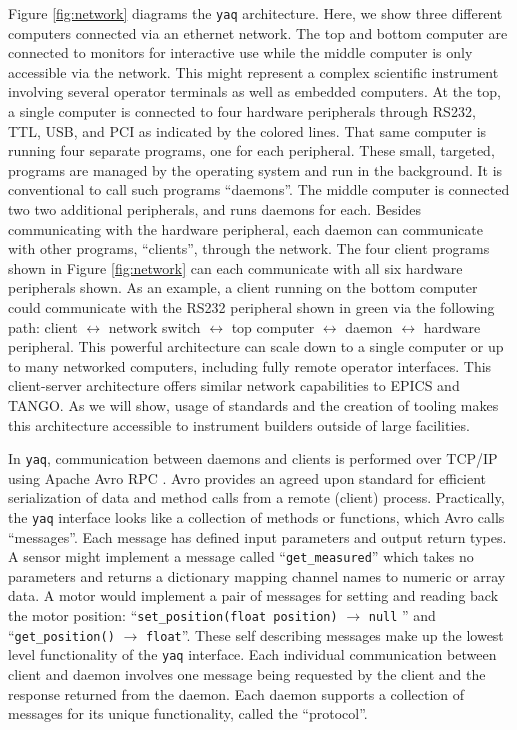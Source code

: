 \documentclass[aip, amsmath, amssymb, reprint,]{revtex4-1}
\newcommand\yaq{\texttt{yaq}}
\begin{document}
Figure \ref{fig:network} diagrams the \yaq{} architecture.
Here, we show three different computers connected via an ethernet network.
The top and bottom computer are connected to monitors for interactive use while the middle computer is only accessible via the network.
This might represent a complex scientific instrument involving several operator terminals as well as embedded computers.
At the top, a single computer is connected to four hardware peripherals through RS232, TTL, USB, and PCI as indicated by the colored lines.
That same computer is running four separate programs, one for each peripheral.
These small, targeted, programs are managed by the operating system and run in the background.
It is conventional to call such programs ``daemons''\cite{Raymond_1996}.
The middle computer is connected two two additional peripherals, and runs daemons for each.
Besides communicating with the hardware peripheral, each daemon can communicate with other programs, ``clients'',  through the network.
The four client programs shown in Figure \ref{fig:network} can each communicate with all six hardware peripherals shown.
As an example, a client running on the bottom computer could communicate with the RS232 peripheral shown in green via the following path: client $\leftrightarrow$ network switch $\leftrightarrow$ top computer $\leftrightarrow$ daemon $\leftrightarrow$ hardware peripheral.
This powerful architecture can scale down to a single computer or up to many networked computers, including fully remote operator interfaces.
This client-server architecture offers similar network capabilities to EPICS and TANGO.
As we will show, usage of standards and the creation of tooling makes this architecture accessible to instrument builders outside of large facilities.

In \yaq{}, communication between daemons and clients is performed over TCP/IP using Apache Avro RPC \cite{AvroSpecification}.
Avro provides an agreed upon standard for efficient serialization of data and method calls from a remote (client) process.
Practically, the \yaq{} interface looks like a collection of methods or functions, which Avro calls ``messages''.
Each message has defined input parameters and output return types.
A sensor might implement a message called ``\texttt{get\_measured}'' which takes no parameters and returns a dictionary mapping channel names to numeric or array data.
A motor would implement a pair of messages for setting and reading back the motor position: ``\texttt{set\_position(float position)} $\rightarrow$ \texttt{null} '' and ``\texttt{get\_position()} $\rightarrow$ \texttt{float}''.
These self describing messages make up the lowest level functionality of the \yaq{} interface.
Each individual communication between client and daemon involves one message being requested by the client and the response returned from the daemon.
Each daemon supports a collection of messages for its unique functionality, called the ``protocol''.
\end{document}
